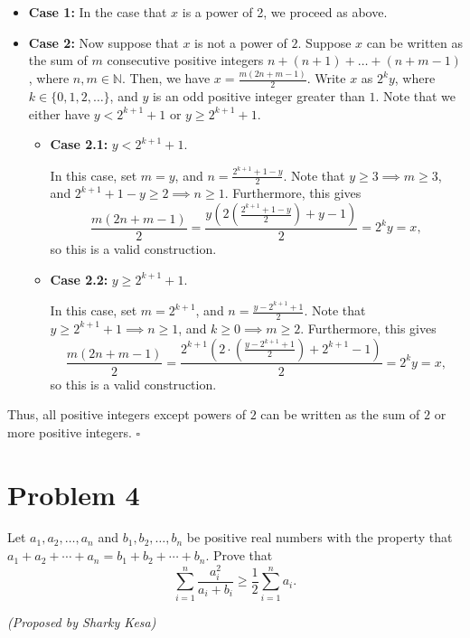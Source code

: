 \documentclass[10pt]{article}
\begin{document}
	\begin{itemize}
	\item \textbf{Case 1:} In the case that \(x\) is a power of 2, we proceed as above.
	\item \textbf{Case 2:} Now suppose that \(x\) is not a power of \(2\). Suppose \(x\) can be written as the sum of \(m\) consecutive positive integers \(n + (n+1) + \dots + (n + m - 1)\), where \(n, m \in \mathbb{N}\). Then, we have \(x = \frac{m(2n + m - 1)}{2}\). Write \(x\) as \(2^k y\), where \(k \in \{0, 1, 2, \dots \}\), and \(y\) is an odd positive integer greater than \(1\). Note that we either have \(y < 2^{k+1} + 1\) or \(y \geq 2^{k+1} + 1\).
		\begin{itemize}
		\renewcommand\labelitemii{•}
		\item \textbf{Case 2.1:} \(y < 2^{k+1} + 1\).
	
	In this case, set \(m = y\), and \(n = \frac{2^{k+1} + 1 - y}{2}\). Note that  \(y \geq 3 \implies m \geq 3\), and \(2^{k+1} + 1 - y \geq 2 \implies n \geq 1\). Furthermore, this gives \[\frac{m(2n+m-1)}{2} = \frac{y\left ( 2 \left( \frac{2^{k+1} + 1 - y}{2} \right) + y - 1 \right )}{2} = 2^k y = x,\] so this is a valid construction.
	
	\item \textbf{Case 2.2:} \(y \geq 2^{k+1} + 1\).
	
	In this case, set \(m = 2^{k+1}\), and \(n = \frac{y - 2^{k+1} + 1}{2}\). Note that \(y \geq 2^{k+1} + 1 \implies n \geq 1\), and \(k \geq 0 \implies m \geq 2\). Furthermore, this gives \[\frac{m(2n+m-1)}{2} = \frac{2^{k+1}\left ( 2 \cdot \left( \frac{y - 2^{k+1} + 1}{2} \right) + 2^{k+1} - 1 \right )}{2} = 2^k y = x,\] so this is a valid construction.
		\end{itemize}
	\end{itemize}
	
	\noindent Thus, all positive integers except powers of \(2\) can be written as the sum of \(2\) or more positive integers. \hfill \ensuremath{\square}
	
	\newpage
	
	\section*{Problem 4}
	
	Let \(a_1, a_2, \dots, a_n\) and \(b_1, b_2, \dots, b_n\) be positive real numbers with the property that \(a_1+a_2+ \cdots + a_n = b_1+b_2+ \cdots + b_n\). Prove that \[\sum_{i=1}^n \frac{a_i^2}{a_i+b_i} \geq \frac 12 \sum_{i=1}^n a_i.\]
	\begin{flushright}
	\textit{(Proposed by Sharky Kesa)}
	\end{flushright}
	
\end{document}
